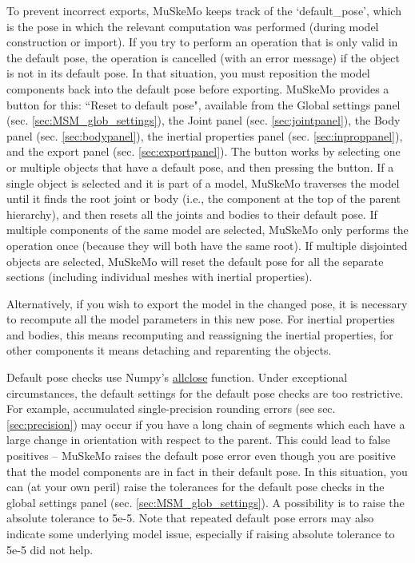 \documentclass{article}
\begin{document}
To prevent incorrect exports, MuSkeMo keeps track of the `default\_pose', which is the pose in which the relevant computation was performed (during model construction or import). If you try to perform an operation that is only valid in the default pose, the operation is cancelled (with an error message) if the object is not in its default pose. In that situation, you must reposition the model components back into the default pose before exporting. MuSkeMo provides a button for this: ``Reset to default pose", available from the Global settings panel (sec. \ref{sec:MSM_glob_settings}), the Joint panel (sec. \ref{sec:jointpanel}), the Body panel (sec. \ref{sec:bodypanel}), the inertial properties panel (sec. \ref{sec:inproppanel}), and the export panel (sec. \ref{sec:exportpanel}). The button works by selecting one or multiple objects that have a default pose, and then pressing the button. If a single object is selected and it is part of a model, MuSkeMo traverses the model until it finds the root joint or body (i.e., the component at the top of the parent hierarchy), and then resets all the joints and bodies to their default pose. If multiple components of the same model are selected, MuSkeMo only performs the operation once (because they will both have the same root). If multiple disjointed objects are selected, MuSkeMo will reset the default pose for all the separate sections (including individual meshes with inertial properties).

Alternatively, if you wish to export the model in the changed pose, it is necessary to recompute all the model parameters in this new pose. For inertial properties and bodies, this means recomputing and reassigning the inertial properties, for other components it means detaching and reparenting the objects.

Default pose checks use Numpy's \href{https://numpy.org/doc/stable/reference/generated/numpy.allclose.html}{allclose} function. Under exceptional circumstances, the default settings for the default pose checks are too restrictive. For example, accumulated single-precision rounding errors (see sec. \ref{sec:precision}) may occur if you have a long chain of segments which each have a large change in orientation with respect to the parent. This could lead to false positives -- MuSkeMo raises the default pose error even though you are positive that the model components are in fact in their default pose. In this situation, you can (at your own peril) raise the tolerances for the default pose checks in the global settings panel (sec. \ref{sec:MSM_glob_settings}). A possibility is to raise the absolute tolerance to 5e-5. Note that repeated default pose errors may also indicate some underlying model issue, especially if raising absolute tolerance to 5e-5 did not help.
\end{document}
